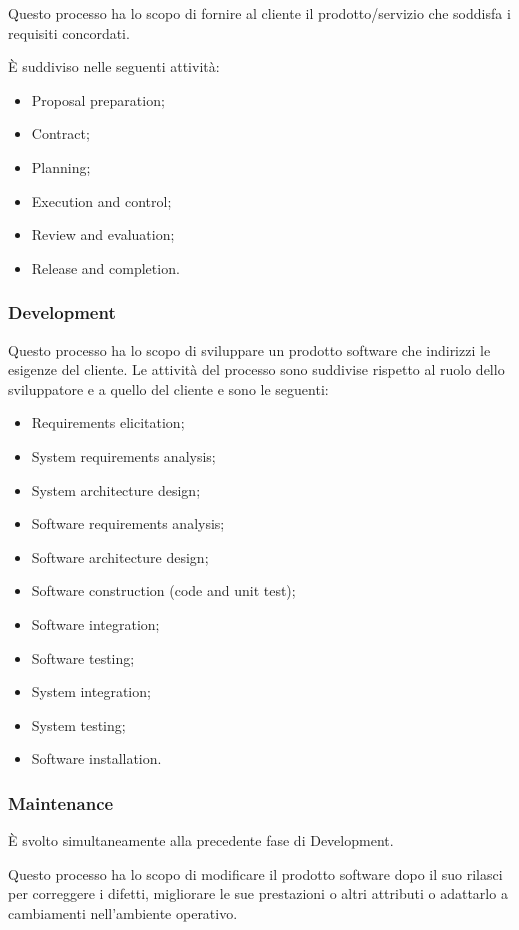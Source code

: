 Questo processo ha lo scopo di fornire al cliente il prodotto/servizio che soddisfa i requisiti concordati.

È suddiviso nelle seguenti attività:
\begin{itemize}
  \item Proposal preparation;
  \item Contract;
  \item Planning;
  \item Execution and control;
  \item Review and evaluation;
  \item Release and completion.
\end{itemize}


\subsubsection{Development}

Questo processo ha lo scopo di sviluppare un prodotto software che indirizzi le esigenze del cliente. Le attività del processo sono suddivise rispetto al ruolo dello sviluppatore e a quello del cliente e sono le seguenti:

\begin{itemize}
  \item Requirements elicitation;
  \item System requirements analysis;
  \item System architecture design;
  \item Software requirements analysis;
  \item Software architecture design;
  \item Software construction (code and unit test);
  \item Software integration;
  \item Software testing;
  \item System integration;
  \item System testing;
  \item Software installation.
\end{itemize}

\subsubsection{Maintenance}
È svolto simultaneamente alla precedente fase di Development.

Questo processo ha lo scopo di modificare il prodotto software dopo il suo rilasci per correggere i difetti, migliorare le sue prestazioni o altri attributi o adattarlo a cambiamenti nell'ambiente operativo.

